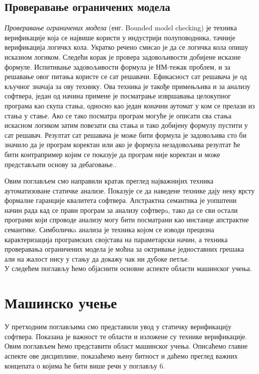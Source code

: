 \documentclass[a4paper]{article}
\begin{document}
{\subsection{Проверавање ограничених модела}
\textit{Проверавање ограничених модела} (енг. Bounded model checking) је техника верификације која се највише користи у индустрији полуповодника, тачније верификација логичкх кола. Укратко речено смисао је да се логичка кола опишу исказном логиком. Следећи корак је провера задовољивости добијене исказне формуле. Испитивање задовољивости формула је НМ-тежак проблем, и за решавање овог питања користе се сат решавачи. Ефикасност сат решавача је од кључног значаја за ову технику. Ова техника је такође примењљива и за анализу софтвера, један од начина примене је посматрање извршавања целокупног програма као скупа стања, односно као један коначни аутомат у ком се прелази из стања у стање. Ако се тако посматра програм могуће је описати сва стања искасном логиком затим повезати сва стања и тако добијену формулу пустити у сат решавач. Резултат сат решавача је може бити формула је задовољива сто би значило да је програм коректан или ако је формула незадовољива резултат ће бити контрапример којим се показује да програм није коректан и може представљати основу за дебаговање.\cite{survey}\cite{dkw2008}.

Овим поглављем смо направили кратак преглед најважнијих техника аутоматизоване статичке анализе. Показује се да наведене
технике дају неку врсту формалне гаранције квалитета софтвера. Апстрактна семантика је уопштени начин рада кад се прави
програм за анализу софтверa, тако да се сви остали програми који спроводе анализу могу бити посматрани као инстанце апстрактне
семантике.  Симболичкa анализа је техника којом се изводи прецизна карактеризација програмских својстава на параметарски начин, а
техника проверавања ограничених модела је моћна за октривање једноставних грешака али на жалост нису у стању да
докажу чак ни дубоке петље. \\
У следећем поглављу ћемо објаснити основне аспекте области машинског учења.

\section{Машинско учење}
У претходним поглављима смо представили увод у статичку верификацију софтвера. Показана је важност те области и изложене су технике верификације. Овим поглављем ћемо представити област машинског учења. Описаћемо главне аспекте ове дисциплине, показаћемо њену битност и даћемо преглед важних концепата о којима ће бити више речи у поглављу 6.

}
\end{document}
